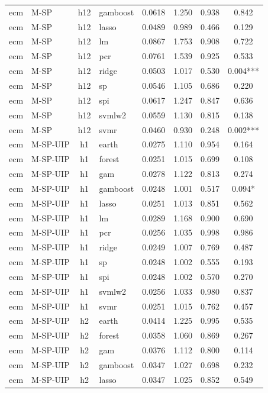 \begin{ThreePartTable}
\begin{longtable}[t]{llclcccc}
ecm & M-SP & h12 & gamboost & 0.0618 & 1.250 & 0.938 & 0.842\\
ecm & M-SP & h12 & lasso & 0.0489 & 0.989 & 0.466 & 0.129\\
ecm & M-SP & h12 & lm & 0.0867 & 1.753 & 0.908 & 0.722\\
ecm & M-SP & h12 & pcr & 0.0761 & 1.539 & 0.925 & 0.533\\
ecm & M-SP & h12 & ridge & 0.0503 & 1.017 & 0.530 & 0.004***\\
ecm & M-SP & h12 & sp & 0.0546 & 1.105 & 0.686 & 0.220\\
ecm & M-SP & h12 & spi & 0.0617 & 1.247 & 0.847 & 0.636\\
ecm & M-SP & h12 & svmlw2 & 0.0559 & 1.130 & 0.815 & 0.138\\
ecm & M-SP & h12 & svmr & 0.0460 & 0.930 & 0.248 & 0.002***\\
\addlinespace
ecm & M-SP-UIP & h1 & earth & 0.0275 & 1.110 & 0.954 & 0.164\\
ecm & M-SP-UIP & h1 & forest & 0.0251 & 1.015 & 0.699 & 0.108\\
ecm & M-SP-UIP & h1 & gam & 0.0278 & 1.122 & 0.813 & 0.274\\
ecm & M-SP-UIP & h1 & gamboost & 0.0248 & 1.001 & 0.517 & 0.094*\\
ecm & M-SP-UIP & h1 & lasso & 0.0251 & 1.013 & 0.851 & 0.562\\
ecm & M-SP-UIP & h1 & lm & 0.0289 & 1.168 & 0.900 & 0.690\\
ecm & M-SP-UIP & h1 & pcr & 0.0256 & 1.035 & 0.998 & 0.986\\
ecm & M-SP-UIP & h1 & ridge & 0.0249 & 1.007 & 0.769 & 0.487\\
ecm & M-SP-UIP & h1 & sp & 0.0248 & 1.002 & 0.555 & 0.193\\
ecm & M-SP-UIP & h1 & spi & 0.0248 & 1.002 & 0.570 & 0.270\\
ecm & M-SP-UIP & h1 & svmlw2 & 0.0256 & 1.033 & 0.980 & 0.837\\
ecm & M-SP-UIP & h1 & svmr & 0.0251 & 1.015 & 0.762 & 0.457\\
\addlinespace
ecm & M-SP-UIP & h2 & earth & 0.0414 & 1.225 & 0.995 & 0.535\\
ecm & M-SP-UIP & h2 & forest & 0.0358 & 1.060 & 0.869 & 0.267\\
ecm & M-SP-UIP & h2 & gam & 0.0376 & 1.112 & 0.800 & 0.114\\
ecm & M-SP-UIP & h2 & gamboost & 0.0347 & 1.027 & 0.698 & 0.232\\
ecm & M-SP-UIP & h2 & lasso & 0.0347 & 1.025 & 0.852 & 0.549\\

\end{longtable}
\end{ThreePartTable}
